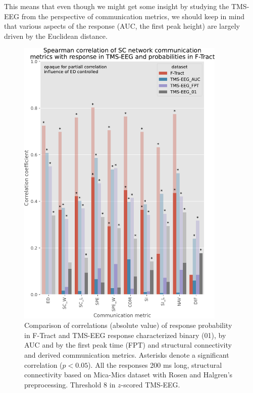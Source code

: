This means that even though we might get some insight by studying the TMS-EEG from the perspective of communication metrics, we should keep in mind that various aspects of the response (AUC, the first peak height) are largely driven by the Euclidean distance. 

\begin{figure}
  \begin{center}
    \includegraphics[width=0.89\textwidth]{images/nootebook_generated/pytepfit_ftract_comparison_results_200ms/Spearman_correlation_of_SC_network_communication_metrics_with_response_in_TMS-EEG_and_probabilities_in_F-Tract.pdf}
  \end{center}
  \caption[Comparison of correlations for F-Tract and TMS-EEG]{Comparison of correlations (absolute value) of response probability in F-Tract and TMS-EEG response characterized binary (01), by AUC and by the first peak time (FPT) and structural connectivity and derived communication metrics. Asterisks denote a significant correlation ($p<0.05$). All the responses 200 ms long, structural connectivity based on Mica-Mics dataset with Rosen and Halgren's preprocessing. Threshold 8 in $z$-scored TMS-EEG.}
  \label{fig:compare-correlations_F-Tract-TMS}
\end{figure}

